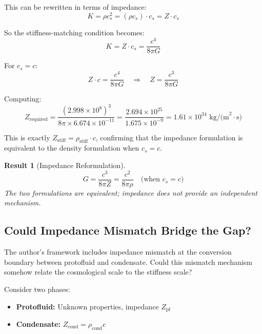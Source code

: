 \documentclass[11pt,a4paper]{article}
\newcommand{\ee}[1]{\times 10^{#1}}
\newcommand{\rhostiff}{\ensuremath{\rho_{\mathrm{stiff}}}}
\newtheorem{result}{Result}
\theoremstyle{definition}
\begin{document}
This can be rewritten in terms of impedance:
\begin{equation}
K = \rho c_s^2 = (\rho c_s) \cdot c_s = Z \cdot c_s
\end{equation}

So the stiffness-matching condition becomes:
\begin{equation}
K = Z \cdot c_s = \frac{c^4}{8\pi G}
\end{equation}

For $c_s = c$:
\begin{equation}
Z \cdot c = \frac{c^4}{8\pi G} \quad \Rightarrow \quad Z = \frac{c^3}{8\pi G}
\end{equation}

Computing:
\begin{equation}
Z_{\mathrm{required}} = \frac{(2.998 \ee{8})^3}{8\pi \times 6.674 \ee{-11}} = \frac{2.694 \ee{25}}{1.675 \ee{-9}} = 1.61 \ee{34} \text{ kg/(m}^2\cdot\text{s)}
\end{equation}

This is exactly $Z_{\mathrm{stiff}} = \rhostiff \cdot c$, confirming that the impedance formulation is equivalent to the density formulation when $c_s = c$.

\begin{result}[Impedance Reformulation]
\begin{equation}
\boxed{G = \frac{c^3}{8\pi Z} = \frac{c^2}{8\pi \rho} \quad \text{(when } c_s = c \text{)}}
\end{equation}
The two formulations are equivalent; impedance does not provide an independent mechanism.
\end{result}

\subsection{Could Impedance Mismatch Bridge the Gap?}
\label{sec:impedance_mismatch}

The author's framework includes impedance mismatch at the conversion boundary between protofluid and condensate. Could this mismatch mechanism somehow relate the cosmological scale to the stiffness scale?

Consider two phases:
\begin{itemize}
    \item \textbf{Protofluid:} Unknown properties, impedance $Z_{\mathrm{pf}}$
    \item \textbf{Condensate:} $Z_{\mathrm{cond}} = \rho_{\mathrm{cond}} c$
\end{itemize}
\end{document}
